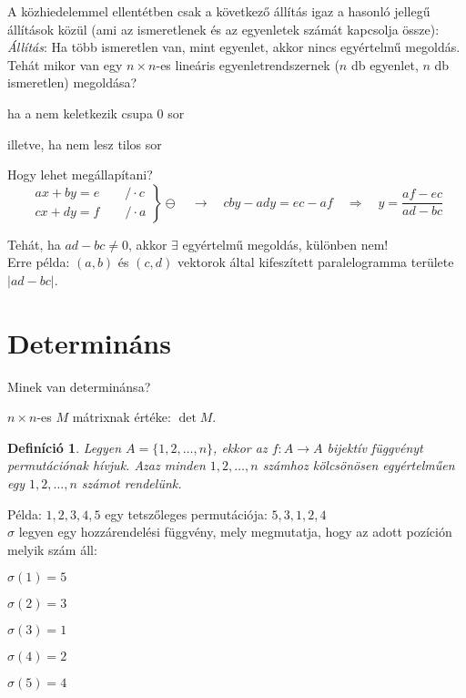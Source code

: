 \documentclass[a4paper,12pt,twoside]{book}
\newtheorem{defi}{Definíció}[chapter]
\theoremstyle{break}
\begin{document}
A közhiedelemmel ellentétben csak a következő állítás igaz a hasonló jellegű állítások közül (ami az ismeretlenek és az egyenletek számát kapcsolja össze):\\
\textit{Állítás}: Ha több ismeretlen van, mint egyenlet, akkor nincs egyértelmű megoldás.\\

Tehát mikor van egy $n\times n$-es lineáris egyenletrendszernek ($n$ db egyenlet, $n$ db ismeretlen) megoldása?
\begin{itemize*}
 \item ha a nem keletkezik csupa 0 sor
 \item illetve, ha nem lesz tilos sor
\end{itemize*}

Hogy lehet megállapítani?
\[\left.
\begin{array}{l}
  ax+by=e \qquad /\cdot c \\
  cx+dy=f \qquad /\cdot a
\end{array}\right\} \ominus \quad \rightarrow \quad
cby-ady=ec-af \quad \Rightarrow \quad y = \frac{af-ec}{ad-bc}
\]

Tehát, ha $ad-bc\neq 0$, akkor $\exists$ egyértelmű megoldás, különben nem!\\
Erre példa: $(a,b)$ és $(c,d)$ vektorok által kifeszített paralelogramma területe $|ad-bc|$.

\section{Determináns}
Minek van determinánsa?
\begin{itemize*}
    \item $n\times n$-es $M$ mátrixnak értéke: $\det M$.
\end{itemize*}

\begin{defi} Legyen $A=\{1,2,\ldots,n\}$, ekkor az $f:A\to A$ bijektív függvényt \emph{permutáció}nak hívjuk. Azaz minden $1,2,\ldots,n$ számhoz kölcsönösen egyértelműen egy $1,2,\ldots,n$ számot rendelünk.\end{defi}
Példa: $1,2,3,4,5$ egy tetszőleges permutációja: $5,3,1,2,4$\\
$\sigma$ legyen egy hozzárendelési függvény, mely megmutatja, hogy az adott pozíción melyik szám áll:
\begin{itemize*}
    \item $\sigma (1)=5$
    \item $\sigma (2)=3$
    \item $\sigma (3)=1$
    \item $\sigma (4)=2$
    \item $\sigma (5)=4$
\end{itemize*}
\end{document}
